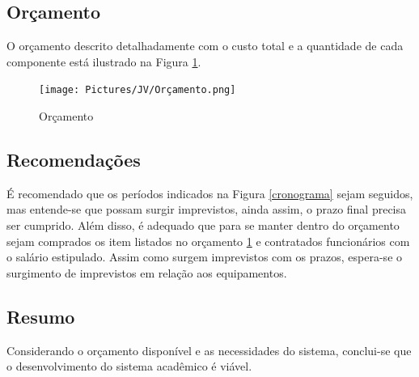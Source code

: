        
        \subsection{Orçamento}  %
            O orçamento descrito detalhadamente com o custo total e a quantidade de cada componente está ilustrado na Figura \ref{orcamento}.
            \begin{figure}[htbp]\centering
                \caption{Orçamento}
                \texttt{[image: Pictures/JV/Orçamento.png]}
                \label{orcamento}
            \end{figure}    %
        
        \subsection{Recomendações}
        
            É recomendado que os períodos indicados na Figura \ref{cronograma} sejam seguidos, mas entende-se que possam surgir imprevistos, ainda assim, o prazo final precisa ser cumprido. Além disso, é adequado que para se manter dentro do orçamento sejam comprados os item listados no orçamento \ref{orcamento} e contratados funcionários com o salário estipulado. Assim como surgem imprevistos com os prazos, espera-se o surgimento de imprevistos em relação aos equipamentos.
        
        \subsection{Resumo}
            Considerando o orçamento disponível e as necessidades do sistema, conclui-se que o desenvolvimento do sistema acadêmico é viável.